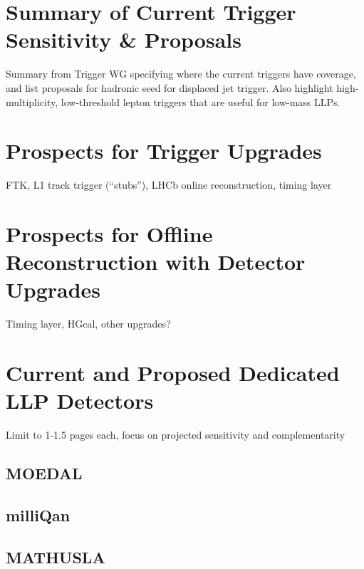 \section{Summary of Current Trigger Sensitivity \& Proposals}
Summary from Trigger WG specifying where the current triggers have coverage, and list proposals for hadronic seed for displaced jet trigger. Also highlight high-multiplicity, low-threshold lepton triggers that are useful for low-mass LLPs.

\section{Prospects for Trigger Upgrades}
FTK, L1 track trigger (``stubs''), LHCb online reconstruction, timing layer

\section{Prospects for Offline Reconstruction with Detector Upgrades}
Timing layer, HGcal, other upgrades?

\section{Current and Proposed Dedicated LLP Detectors}

Limit to 1-1.5 pages each, focus on projected sensitivity and complementarity

\subsection{MOEDAL}
\subsection{milliQan}
\subsection{MATHUSLA}
